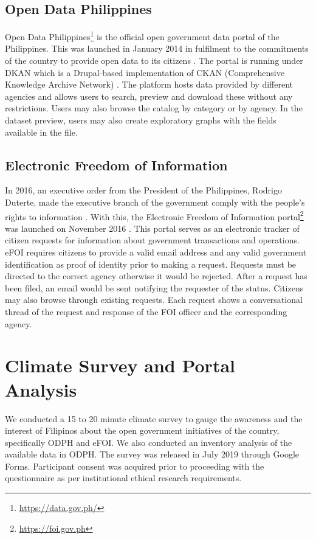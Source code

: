 \documentclass{sigchi}
\begin{document}
\subsection{Open Data Philippines}
Open Data Philippines\footnote{\url{https://data.gov.ph/}} is the official open government data portal of the Philippines. This was launched in January 2014 in fulfilment to the commitments of the country to provide open data to its citizens \cite{ODPH2015}. The portal is running under DKAN which is a Drupal-based implementation of CKAN (Comprehensive Knowledge Archive Network) \cite{dkan2019}. The platform hosts data provided by different agencies and allows users to search, preview and download these without any restrictions. Users may also browse the catalog by category or by agency. In the dataset preview, users may also create exploratory graphs with the fields available in the file.


\subsection{Electronic Freedom of Information}
In 2016, an executive order from the President of the Philippines, Rodrigo Duterte, made the executive branch of the government comply with the people's rights to information \cite{duterte2016}. With this, the Electronic Freedom of Information portal\footnote{\url{https://foi.gov.ph}} was launched on November 2016 \cite{cigaral2016}. This portal serves as an electronic tracker of citizen requests for information about government transactions and operations. eFOI requires citizens to provide a valid email address and any valid government identification as proof of identity prior to making a request. Requests must be directed to the correct agency otherwise it would be rejected. After a request has been filed, an email would be sent notifying the requester of the status. Citizens may also browse through existing requests. Each request shows a conversational thread of the request and response of the FOI officer and the corresponding agency. 

\section{Climate Survey and Portal Analysis}
We conducted a 15 to 20 minute climate survey to gauge the awareness and the interest of Filipinos about the open government initiatives of the country, specifically ODPH and eFOI. We also conducted an inventory analysis of the available data in ODPH. The survey was released in July 2019 through Google Forms. Participant consent was acquired prior to proceeding with the questionnaire as per institutional ethical research requirements.
\end{document}
